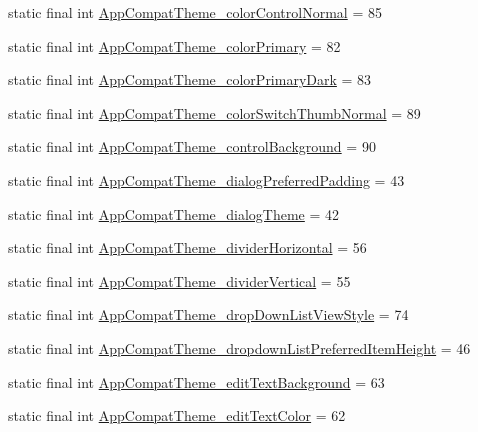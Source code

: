 \begin{DoxyCompactItemize}
\item 
static final int \hyperlink{classproject4_1_1xaria_1_1R_1_1styleable_ab2853953a006b42c5c1b2506859cd11f}{App\+Compat\+Theme\+\_\+color\+Control\+Normal} = 85
\item 
static final int \hyperlink{classproject4_1_1xaria_1_1R_1_1styleable_a7389b87a9f3b557790bc968515833ae4}{App\+Compat\+Theme\+\_\+color\+Primary} = 82
\item 
static final int \hyperlink{classproject4_1_1xaria_1_1R_1_1styleable_ae0e5b2077cb1158569a4fbda2aa8dd71}{App\+Compat\+Theme\+\_\+color\+Primary\+Dark} = 83
\item 
static final int \hyperlink{classproject4_1_1xaria_1_1R_1_1styleable_acfe6607b27354b339604b23a504dfad6}{App\+Compat\+Theme\+\_\+color\+Switch\+Thumb\+Normal} = 89
\item 
static final int \hyperlink{classproject4_1_1xaria_1_1R_1_1styleable_a476553481ffe8e73dfc05dfcd351d945}{App\+Compat\+Theme\+\_\+control\+Background} = 90
\item 
static final int \hyperlink{classproject4_1_1xaria_1_1R_1_1styleable_a23b0ff0c142da87ba4d26058c02051dd}{App\+Compat\+Theme\+\_\+dialog\+Preferred\+Padding} = 43
\item 
static final int \hyperlink{classproject4_1_1xaria_1_1R_1_1styleable_a5519afdb0c80e54310abbe3db266a072}{App\+Compat\+Theme\+\_\+dialog\+Theme} = 42
\item 
static final int \hyperlink{classproject4_1_1xaria_1_1R_1_1styleable_ade51be41034a192ff35bec03ba87a1aa}{App\+Compat\+Theme\+\_\+divider\+Horizontal} = 56
\item 
static final int \hyperlink{classproject4_1_1xaria_1_1R_1_1styleable_a2fa98253e4b6f3756570cd37fb944000}{App\+Compat\+Theme\+\_\+divider\+Vertical} = 55
\item 
static final int \hyperlink{classproject4_1_1xaria_1_1R_1_1styleable_ac0bd97fcf21ebf1428f0681d50718950}{App\+Compat\+Theme\+\_\+drop\+Down\+List\+View\+Style} = 74
\item 
static final int \hyperlink{classproject4_1_1xaria_1_1R_1_1styleable_a6564d560cb7e73a0123ed899c3b6ad2e}{App\+Compat\+Theme\+\_\+dropdown\+List\+Preferred\+Item\+Height} = 46
\item 
static final int \hyperlink{classproject4_1_1xaria_1_1R_1_1styleable_a197825ebee98f93494e82626ee54087e}{App\+Compat\+Theme\+\_\+edit\+Text\+Background} = 63
\item 
static final int \hyperlink{classproject4_1_1xaria_1_1R_1_1styleable_a8fff9c294080610c2f55e32050dda6d5}{App\+Compat\+Theme\+\_\+edit\+Text\+Color} = 62

\end{DoxyCompactItemize}

